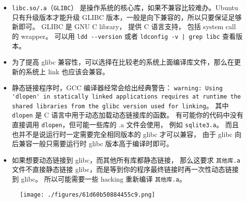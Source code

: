 \begin{itemize}
\item \verb`libc.so/.a`（\verb`GLIBC`） 是操作系统的核心库，如果不兼容比较难办。Ubuntu 只有升级版本才能升级 GLIBC 版本，一般是向下兼容的，所以只要保证足够新即可。 GLIBC 是 GNU C library， 提供 C 语言支持， 包括 system call 的 wrapper。 可以用 \verb`ldd --version` 或者 \verb`ldconfig -v | grep libc` 查看版本。
\item 为了提高 glibc 兼容性，可以选择在比较老的系统上面编译库文件，那么在更新的系统上 link 也应该会兼容。
\item 静态链接程序时，GCC 编译器经常会给出经典警告： \verb`warning: Using 'dlopen' in statically linked applications requires at runtime the shared libraries from the glibc version used for linking`。 其中 \verb`dlopen` 是 C 语言中用于动态加载动态链接库的函数。 有可能你的代码中没有直接调用 \verb`dlopen`，但可能一些库的 .a 文件会使用， 例如 \verb`sqlite3.a`。 而且也并不是说运行时一定需要完全相同版本的 glibc 才可以兼容， 由于 glibc 向后兼容一般只需要运行时 glibc 版本高于编译时即可。
\item 如果想要动态链接到 glibc，而其他所有库都静态链接， 那么这要求 \verb`其他库.a` 文件不直接静态链接 glibc，而是等到你的程序最终链接时再一次性动态链接到 glibc。 所以可能需要一些 hacking 重新编译 \verb`其他库.a`。
\end{itemize}

\begin{figure}[ht]
\centering
\texttt{[image: ./figures/61d60b50884455c9.png]}
\caption{} \label{fig_LinBin_1}
\end{figure}
